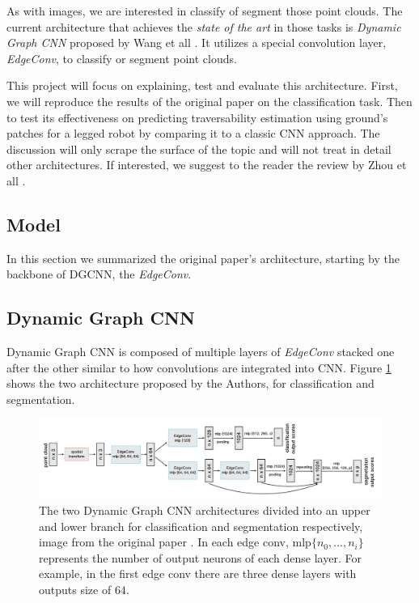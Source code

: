 \documentclass[twocolumn,showpacs,
  nofootinbib,aps,superscriptaddress,
  eqsecnum,prd,notitlepage,showkeys,10pt]{revtex4-1}
\begin{document}
As with images, we are interested in classify of segment those point clouds. The current architecture that achieves the \emph{state of the art} in those tasks is \emph{Dynamic Graph CNN} proposed by Wang et all \cite{dgcnn}. It utilizes a special convolution layer,  \emph{EdgeConv}, to classify or segment point clouds. 

This project will focus on explaining, test and evaluate this architecture. First, we will reproduce the results of the original paper on the classification task. Then to test its effectiveness on predicting traversability estimation using ground's patches for a legged robot by comparing it to a classic CNN approach. The discussion will only scrape the surface of the topic and will not treat in detail other architectures. If interested, we suggest to the reader the review by Zhou et all \cite{1812.08434}.
\subsection{Model}
In this section we summarized the original paper's architecture, starting by the backbone of DGCNN, the \emph{EdgeConv}.
\subsection{Dynamic Graph CNN}
Dynamic Graph CNN is composed of multiple layers of \emph{EdgeConv} stacked one after the other similar to how convolutions are integrated into CNN. Figure \ref{fig : DGCNN} shows the two architecture proposed by the Authors, for classification and segmentation. 
\begin{figure}
  \centering
  \includegraphics[width=\linewidth]{images/DGCNN.png}
\caption{The two Dynamic Graph CNN architectures divided into an upper and lower branch for classification and segmentation respectively, image from the original paper \cite{dgcnn}. In each edge conv, mlp$\{n_0, ..., n_{i}\}$ represents the number of output neurons of each dense layer. For example, in the first edge conv there are three dense layers with outputs size of $64$.}
\label{fig : DGCNN}
\end{figure}
\end{document}
